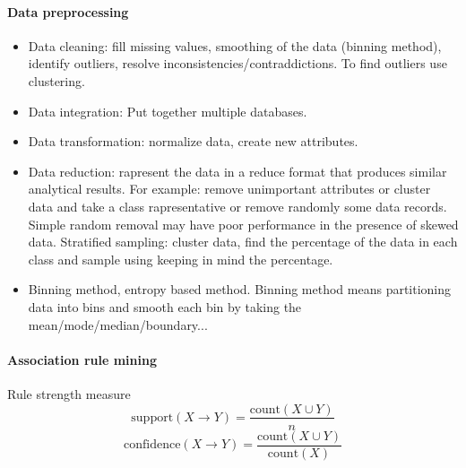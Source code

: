 \documentclass[12pt,oneside,a4paper]{article}
\begin{document}
\paragraph{Data preprocessing}
\begin{itemize}
    \item Data cleaning: fill missing values, smoothing of the data (binning method), identify outliers, resolve inconsistencies/contraddictions.
          To find outliers use clustering.
    \item Data integration: Put together multiple databases.
    \item Data transformation: normalize data, create new attributes.
    \item Data reduction: rapresent the data in a reduce format that produces similar analytical results. For example: remove unimportant attributes or cluster data and take a class rapresentative or remove randomly some data records. Simple random removal may have poor performance in the presence of skewed data. Stratified sampling: cluster data, find the percentage of the data in each class and sample using keeping in mind the percentage.
    \item Binning method, entropy based method.
          Binning method means partitioning data into bins and smooth each bin by taking the mean/mode/median/boundary...
\end{itemize}


\paragraph{Association rule mining}
Rule strength measure
\[
    \text{support}(X \rightarrow Y) = \frac{\text{count}(X \cup Y)}{n}
\]
\[
    \text{confidence}(X \rightarrow Y) = \frac{\text{count}(X \cup Y)}{\text{count}(X)}
\]
\end{document}
